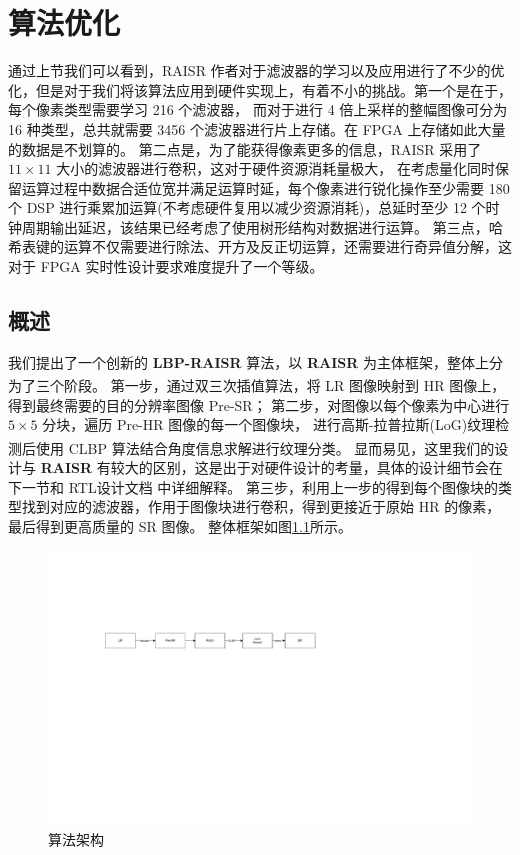 \documentclass[12pt, a4paper, oneside]{ctexbook}
\begin{document}
	\chapter{算法优化}
	通过上节我们可以看到，RAISR 作者对于滤波器的学习以及应用进行了不少的优化，但是对于我们将该算法应用到硬件实现上，有着不小的挑战。第一个是在于，每个像素类型需要学习 216 个滤波器，
	而对于进行 4 倍上采样的整幅图像可分为 16 种类型，总共就需要 3456 个滤波器进行片上存储。在 FPGA 上存储如此大量的数据是不划算的。
	第二点是，为了能获得像素更多的信息，RAISR 采用了 $11\times11$ 大小的滤波器进行卷积，这对于硬件资源消耗量极大，
	在考虑量化同时保留运算过程中数据合适位宽并满足运算时延，每个像素进行锐化操作至少需要 180 个 DSP 进行乘累加运算(不考虑硬件复用以减少资源消耗)，总延时至少 12 个时钟周期输出延迟，该结果已经考虑了使用树形结构对数据进行运算。
	第三点，哈希表键的运算不仅需要进行除法、开方及反正切运算，还需要进行奇异值分解，这对于 FPGA 实时性设计要求难度提升了一个等级。
	\section{概述}
	我们提出了一个创新的 \textbf{LBP-RAISR} 算法，以 \textbf{RAISR} 为主体框架，整体上分为了三个阶段。
	第一步，通过双三次插值算法\textsuperscript{\cite{4}\cite{5}}，将 LR 图像映射到 HR 图像上，得到最终需要的目的分辨率图像 Pre-SR；
	第二步，对图像以每个像素为中心进行 $5\times5$ 分块，遍历 Pre-HR 图像的每一个图像块，
	进行高斯-拉普拉斯(LoG)纹理检测后使用 CLBP 算法\textsuperscript{\cite{8}\cite{9}}结合角度信息求解进行纹理分类。
	显而易见，这里我们的设计与 \textbf{RAISR} 有较大的区别，这是出于对硬件设计的考量，具体的设计细节会在下一节和 RTL设计文档 中详细解释。
	第三步，利用上一步的得到每个图像块的类型找到对应的滤波器，作用于图像块进行卷积，得到更接近于原始 HR 的像素，最后得到更高质量的 SR 图像。
	整体框架如图\ref{overview}所示。
	\begin{figure}[h]
		\centering
		\includegraphics[scale=0.72]{./pic/overview.pdf}
		\caption{算法架构}
		\label{overview}
	\end{figure}
\end{document}

